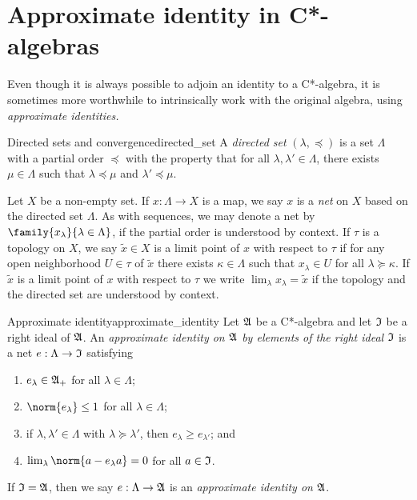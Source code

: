 \section{Approximate identity in C*-algebras}
Even though it is always possible to adjoin an identity to a C*-algebra, it is sometimes more worthwhile to intrinsically work with the original algebra, using \emph{approximate identities.}

\begin{definition}{Directed sets and convergence}{directed_set}
    A \emph{directed set} \((\lambda, \preceq)\) is a set \(\Lambda\) with a partial order \(\preceq\) with the property that for all \(\lambda, \lambda' \in \Lambda\), there exists \(\mu \in \Lambda\) such that \(\lambda \preceq \mu\) and \(\lambda' \preceq \mu\).

    Let \(X\) be a non-empty set. If \(x : \Lambda \to X\) is a map, we say \(x\) is a \emph{net} on \(X\) based on the directed set \(\Lambda\). As with sequences, we may denote a net by \(\family{x_{\lambda}}{\lambda \in \Lambda}\), if the partial order is understood by context. If \(\tau\) is a topology on \(X\), we say \(\tilde{x} \in X\) is a limit point of \(x\) with respect to \(\tau\) if for any open neighborhood \(U \in \tau\) of \(\tilde{x}\) there exists \(\kappa\in \Lambda\) such that \(x_{\lambda} \in U\) for all \(\lambda \succeq \kappa\). If \(\tilde{x}\) is a limit point of \(x\) with respect to \(\tau\) we write \(\lim_{\lambda} x_{\lambda} = \tilde{x}\) if the topology and the directed set are understood by context.
\end{definition}

\begin{definition}{Approximate identity}{approximate_identity}
    Let \(\mathfrak{A}\) be a C*-algebra and let \(\mathfrak{I}\) be a right ideal of \(\mathfrak{A}\). An \emph{approximate identity on \(\mathfrak{A}\) by elements of the right ideal \(\mathfrak{I}\)} is a net \(e : \Lambda \to \mathfrak{I}\) satisfying
    \begin{enumerate}[label=(\alph*)]
        \item \(e_{\lambda} \in \mathfrak{A}_+\) for all \(\lambda \in \Lambda\);
        \item \(\norm{e_{\lambda}}\leq 1\) for all \(\lambda \in \Lambda\);
        \item if \(\lambda, \lambda' \in \Lambda\) with \(\lambda \succeq \lambda'\), then \(e_{\lambda} \geq e_{\lambda'}\); and
        \item \(\lim_{\lambda}{\norm{a - e_{\lambda}a}}= 0\) for all \(a \in \mathfrak{I}\).
    \end{enumerate}
    If \(\mathfrak{I} = \mathfrak{A}\), then we say \(e : \Lambda \to \mathfrak{A}\) is an \emph{approximate identity on \(\mathfrak{A}\)}.
\end{definition}


